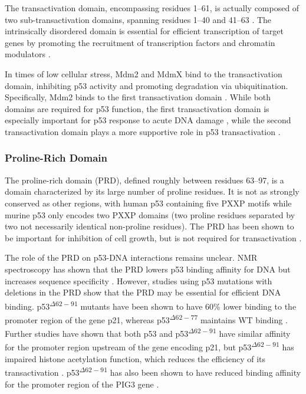 The transactivation domain, encompassing residues \numrange{1}{61}, is actually composed of two sub-transactivation domains, spanning residues \numrange{1}{40} and \numrange{41}{63} \parencite{unger1993functional, chang1995transactivation, candau1997two, zhu1998identification}. The intrinsically disordered domain is essential for efficient transcription of target genes by promoting the recruitment of transcription factors and chromatin modulators \parencite{rajTransactivationDomainsP532017a}.

In times of low cellular stress, Mdm2 and MdmX bind to the transactivation domain, inhibiting p53 activity and promoting degradation via ubiquitination. Specifically, Mdm2 binds to the first transactivation domain \parencite{hauptMdm2PromotesRapid1997}. While both domains are required for p53 function, the first transactivation domain is especially important for p53 response to acute DNA damage \parencite{kuoP53TransactivationDomain2022}, while the second transactivation domain plays a more supportive role in p53 transactivation \parencite{millerjenkinsCharacterizationP300Taz2p532015, rajagopalanMappingPhysicalFunctional2010}.

\subsubsection{Proline-Rich Domain}

The proline-rich domain (PRD), defined roughly between residues \numrange{63}{97}, is a domain characterized by its large number of proline residues. It is not as strongly conserved as other regions, with human p53 containing five PXXP motifs while murine p53 only encodes two PXXP domains (two proline residues separated by two not necessarily identical non-proline residues). The PRD has been shown to be important for inhibition of cell growth, but is not required for transactivation \parencite{walker1996identification, zhangMultifunctionalProlinerichDomain2025}.

The role of the PRD on p53-DNA interactions remains unclear. NMR spectroscopy has shown that the PRD lowers p53 binding affinity for DNA but increases sequence specificity \parencite{he2019interaction}. However, studies using p53 mutations with deletions in the PRD show that the PRD may be essential for efficient DNA binding. p53\textsuperscript{\(\Delta62-91\)} mutants have been shown to have 60\% lower binding to the promoter region of the gene p21, whereas p53\textsuperscript{\(\Delta62-77\)} maintains WT binding \parencite{alexander2021p53}. Further studies have shown that both p53 and p53\textsuperscript{\(\Delta62-91\)} have similar affinity for the promoter region upstream of the gene encoding p21, but p53\textsuperscript{\(\Delta62-91\)} has impaired histone acetylation function, which reduces the efficiency of its transactivation \parencite{liu2003activation}. p53\textsuperscript{\(\Delta62-91\)} has also been shown to have reduced binding affinity for the promoter region of the PIG3 gene \parencite{roth2000tumor, venot1998requirement}.

